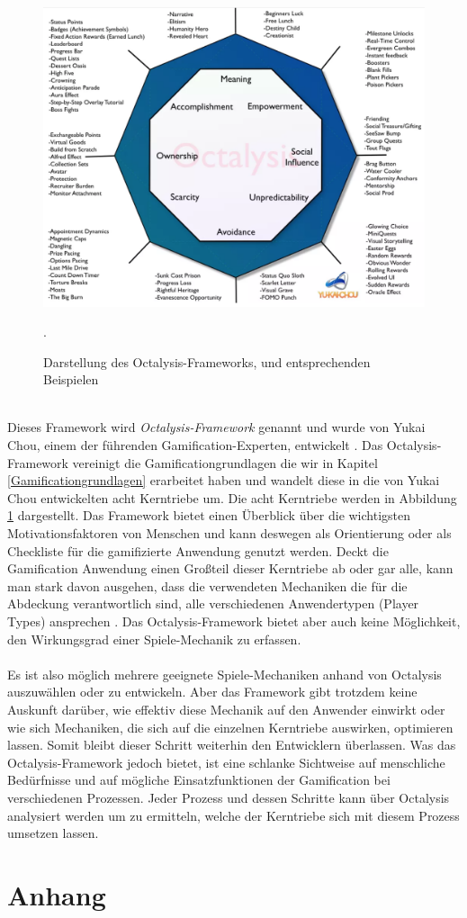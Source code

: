 \documentclass[a4paper,12pt,twoside]{scrartcl}
\begin{document}
\\
\begin{figure}[h!]
\begin{center}
\includegraphics[scale = 0.4]{Bilder/BildOctalisys.png}
\caption{Darstellung des Octalysis-Frameworks, und entsprechenden Beispielen \cite{Octalisys}}.
\label{Kerntriebe}
\end{center}
\end{figure} 
\\
Dieses Framework wird \textit{Octalysis-Framework} genannt und wurde von Yukai Chou, einem der führenden Gamification-Experten, entwickelt \cite{Octalisys}. Das Octalysis-Framework vereinigt die Gamificationgrundlagen die wir in Kapitel \ref{Gamificationgrundlagen} erarbeitet haben und wandelt diese in die von Yukai Chou entwickelten acht Kerntriebe um. Die acht Kerntriebe werden in Abbildung \ref{Kerntriebe} dargestellt. Das Framework bietet einen Überblick über die wichtigsten Motivationsfaktoren von Menschen und kann deswegen als Orientierung oder als Checkliste für die gamifizierte Anwendung genutzt werden. Deckt die Gamification Anwendung einen Großteil dieser Kerntriebe ab oder gar alle, kann man stark davon ausgehen, dass die verwendeten Mechaniken die für die Abdeckung verantwortlich sind, alle verschiedenen Anwendertypen (Player Types) ansprechen \cite{chou2013}. Das Octalysis-Framework bietet aber auch keine Möglichkeit, den Wirkungsgrad einer Spiele-Mechanik zu erfassen. 
\\\\
Es ist also möglich mehrere geeignete Spiele-Mechaniken anhand von Octalysis auszuwählen oder zu entwickeln. Aber das Framework gibt trotzdem keine Auskunft darüber, wie effektiv diese Mechanik auf den Anwender einwirkt oder wie sich Mechaniken, die sich auf die einzelnen Kerntriebe auswirken, optimieren lassen. Somit bleibt dieser Schritt weiterhin den Entwicklern überlassen. Was das Octalysis-Framework jedoch bietet, ist eine schlanke Sichtweise auf menschliche Bedürfnisse und auf mögliche Einsatzfunktionen der Gamification bei verschiedenen Prozessen. Jeder Prozess und dessen Schritte kann über Octalysis analysiert werden um zu ermitteln, welche der Kerntriebe sich mit diesem Prozess umsetzen lassen.
\cleardoublepage
\section{Anhang} 

\newpage
\listoftables
\listoffigures
\newpage

\end{document}
